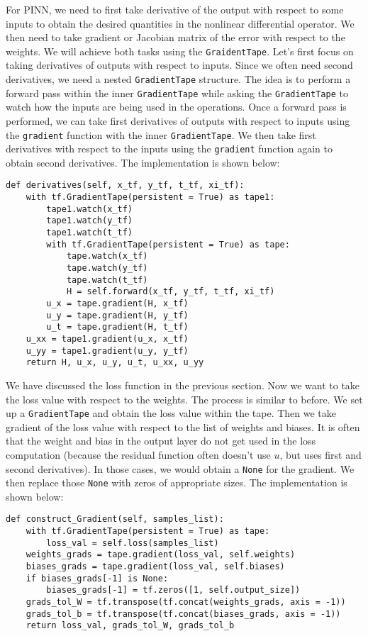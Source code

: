 \documentclass{article}
\begin{document}
For PINN, we need to first take derivative of the output with respect to some inputs to obtain the desired quantities in the nonlinear differential operator. We then need to take gradient or Jacobian matrix of the error with respect to the weights. We will achieve both tasks using the \texttt{GraidentTape}. Let's first focus on taking derivatives of outputs with respect to inputs. Since we often need second derivatives, we need a nested \texttt{GradientTape} structure. The idea is to perform a forward pass within the inner \texttt{GradientTape} while asking the \texttt{GradientTape} to watch how the inputs are being used in the operations. Once a forward pass is performed, we can take first derivatives of outputs with respect to inputs using the \texttt{gradient} function with the inner \texttt{GradientTape}. We then take first derivatives with respect to the inputs using the \texttt{gradient} function again to obtain second derivatives. The implementation is shown below:
\begin{lstlisting}
def derivatives(self, x_tf, y_tf, t_tf, xi_tf):
	with tf.GradientTape(persistent = True) as tape1:
		tape1.watch(x_tf)
		tape1.watch(y_tf)
		tape1.watch(t_tf)
		with tf.GradientTape(persistent = True) as tape:
			tape.watch(x_tf)
			tape.watch(y_tf)
			tape.watch(t_tf)
			H = self.forward(x_tf, y_tf, t_tf, xi_tf)
		u_x = tape.gradient(H, x_tf)
		u_y = tape.gradient(H, y_tf)
		u_t = tape.gradient(H, t_tf)
	u_xx = tape1.gradient(u_x, x_tf)
	u_yy = tape1.gradient(u_y, y_tf)
	return H, u_x, u_y, u_t, u_xx, u_yy
\end{lstlisting}

We have discussed the loss function in the previous section. Now we want to take the loss value with respect to the weights. The process is similar to before. We set up a \texttt{GradientTape} and obtain the loss value within the tape. Then we take gradient of the loss value with respect to the list of weights and biases. It is often that the weight and bias in the output layer do not get used in the loss computation (because the residual function often doesn't use $u$, but uses first and second derivatives). In those cases, we would obtain a \texttt{None} for the gradient. We then replace those \texttt{None} with zeros of appropriate sizes. The implementation is shown below:
\begin{lstlisting}
def construct_Gradient(self, samples_list):
	with tf.GradientTape(persistent = True) as tape:
		loss_val = self.loss(samples_list)
	weights_grads = tape.gradient(loss_val, self.weights)
	biases_grads = tape.gradient(loss_val, self.biases)
	if biases_grads[-1] is None:
		biases_grads[-1] = tf.zeros([1, self.output_size])
	grads_tol_W = tf.transpose(tf.concat(weights_grads, axis = -1))
	grads_tol_b = tf.transpose(tf.concat(biases_grads, axis = -1))
	return loss_val, grads_tol_W, grads_tol_b
\end{lstlisting}
\end{document}
